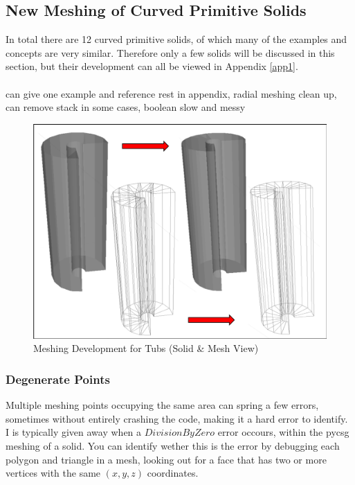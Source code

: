\documentclass[12pt,a4paper]{article}
\begin{document}
\subsection{New Meshing of Curved Primitive Solids}
In total there are 12 curved primitive solids, of which many of the examples and concepts are very similar. Therefore only a few solids will be discussed in this section, but their development can all be viewed in Appendix \ref{app1}.
\\\\
can give one example and reference rest in appendix, radial meshing clean up, can remove stack in some cases, boolean slow and messy

\begin{figure}[h!]
\centering
\includegraphics[scale=0.5]{Images//Meshes//tubs.png}
\caption[width=\columnwidth]{Meshing Development for Tubs (Solid \& Mesh View)}
\label{tubspic}
\end{figure}

\subsubsection{Degenerate Points}
Multiple meshing points occupying the same area can spring a few errors, sometimes without entirely crashing the code, making it a hard error to identify. I is typically given away when a $DivisionByZero$ error occours, within the pycsg meshing of a solid. You can identify wether this is the error by debugging each polygon and triangle in a mesh, looking out for a face that has two or more vertices with the same $(x,y,z)$ coordinates.
\end{document}
